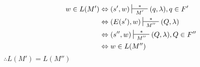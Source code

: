 \begin{align*}
w \in L(M') & \Leftrightarrow (s',w) \sststile{M'}{\hspace{0.25cm} * \hspace{0.25cm}} (q,\lambda), q\in F' \\
& \Leftrightarrow	(E(s'),w) \sststile{M''}{\hspace{0.25cm} * \hspace{0.25cm}} (Q,\lambda)\\
& \Leftrightarrow (s'',w) \sststile{M''}{\hspace{0.25cm} * \hspace{0.25cm}} (Q,\lambda), Q\in F'' \\
& \Leftrightarrow  w\in L(M'')
\end{align*}
$\therefore L(M')=L(M'')$